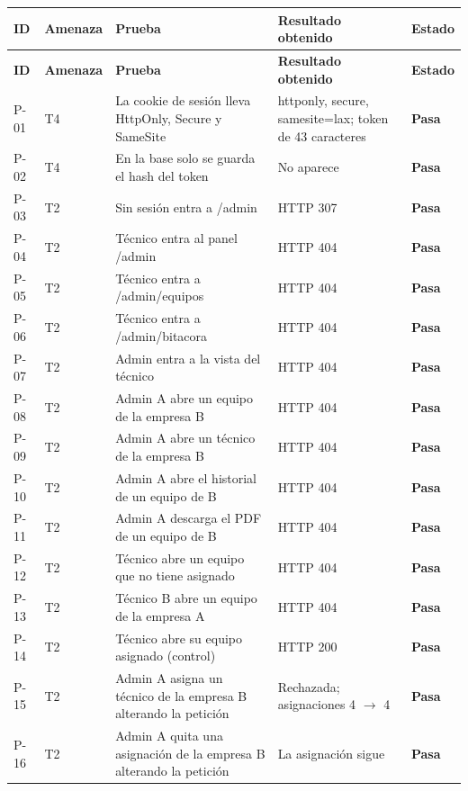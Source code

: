 \documentclass[12pt, letterpaper]{article}
\begin{document}
\begingroup\small\setlength{\tabcolsep}{4pt}\renewcommand{\arraystretch}{1.25}
\begin{longtable}{L{0.07}L{0.11}L{0.34}L{0.32}L{0.08}}
\toprule
\textbf{ID} & \textbf{Amenaza} & \textbf{Prueba} & \textbf{Resultado obtenido} & \textbf{Estado} \\
\midrule
\endfirsthead
\toprule
\textbf{ID} & \textbf{Amenaza} & \textbf{Prueba} & \textbf{Resultado obtenido} & \textbf{Estado} \\
\midrule
\endhead
\bottomrule
\endfoot
P-01 & T4 & La cookie de sesión lleva HttpOnly, Secure y SameSite & httponly, secure, samesite=lax; token de 43 caracteres & \textbf{Pasa} \\
P-02 & T4 & En la base solo se guarda el hash del token & No aparece & \textbf{Pasa} \\
P-03 & T2 & Sin sesión entra a /admin & HTTP 307 & \textbf{Pasa} \\
P-04 & T2 & Técnico entra al panel /admin & HTTP 404 & \textbf{Pasa} \\
P-05 & T2 & Técnico entra a /admin/equipos & HTTP 404 & \textbf{Pasa} \\
P-06 & T2 & Técnico entra a /admin/bitacora & HTTP 404 & \textbf{Pasa} \\
P-07 & T2 & Admin entra a la vista del técnico & HTTP 404 & \textbf{Pasa} \\
P-08 & T2 & Admin A abre un equipo de la empresa B & HTTP 404 & \textbf{Pasa} \\
P-09 & T2 & Admin A abre un técnico de la empresa B & HTTP 404 & \textbf{Pasa} \\
P-10 & T2 & Admin A abre el historial de un equipo de B & HTTP 404 & \textbf{Pasa} \\
P-11 & T2 & Admin A descarga el PDF de un equipo de B & HTTP 404 & \textbf{Pasa} \\
P-12 & T2 & Técnico abre un equipo que no tiene asignado & HTTP 404 & \textbf{Pasa} \\
P-13 & T2 & Técnico B abre un equipo de la empresa A & HTTP 404 & \textbf{Pasa} \\
P-14 & T2 & Técnico abre su equipo asignado (control) & HTTP 200 & \textbf{Pasa} \\
P-15 & T2 & Admin A asigna un técnico de la empresa B alterando la petición & Rechazada; asignaciones 4 $\rightarrow$ 4 & \textbf{Pasa} \\
P-16 & T2 & Admin A quita una asignación de la empresa B alterando la petición & La asignación sigue & \textbf{Pasa} \\

\end{longtable}
\end{document}
